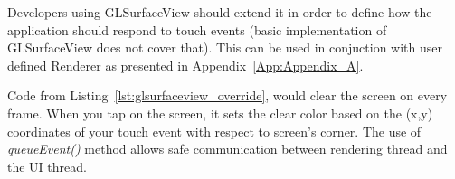 %

Developers using GLSurfaceView should extend it in order to define how the application should respond to touch events (basic implementation of GLSurfaceView does not cover that). 
This can be used in conjuction with user defined Renderer as presented in Appendix~\ref{App:Appendix_A}. 

%

Code from Listing~\ref{lst:glsurfaceview_override}, would clear the screen on every frame.
When you tap on the screen, it sets the clear color based on the (x,y) coordinates of your touch event with respect to screen's corner.
The use of \emph{queueEvent()} method allows safe communication between rendering thread and the UI thread.